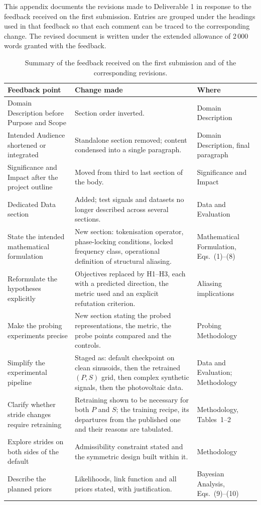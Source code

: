 This appendix documents the revisions made to Deliverable 1 in response to the feedback received on the first submission. Entries are grouped under the headings used in that feedback so that each comment can be traced to the corresponding change. The revised document is written under the extended allowance of 2\,000 words granted with the feedback.

\begin{table}[htbp]
\centering
\small
\begin{tabular}{p{4.0cm} p{7.2cm} p{3.4cm}}
\toprule
\textbf{Feedback point} & \textbf{Change made} & \textbf{Where} \\
\midrule
Domain Description before Purpose and Scope
  & Section order inverted.
  & Domain Description \\
Intended Audience shortened or integrated
  & Standalone section removed; content condensed into a single paragraph.
  & Domain Description, final paragraph \\
Significance and Impact after the project outline
  & Moved from third to last section of the body.
  & Significance and Impact \\
Dedicated Data section
  & Added; test signals and datasets no longer described across several sections.
  & Data and Evaluation \\
State the intended mathematical formulation
  & New section: tokenisation operator, phase-locking conditions, locked
    frequency class, operational definition of structural aliasing.
  & Mathematical Formulation, Eqs.~(1)--(8) \\
Reformulate the hypotheses explicitly
  & Objectives replaced by H1--H3, each with a predicted direction, the metric
    used and an explicit refutation criterion.
  & Aliasing implications \\
Make the probing experiments precise
  & New section stating the probed representations, the metric, the probe
    points compared and the controls.
  & Probing Methodology \\
Simplify the experimental pipeline
  & Staged as: default checkpoint on clean sinusoids, then the retrained
    $(P,S)$ grid, then complex synthetic signals, then the photovoltaic data.
  & Data and Evaluation; Methodology \\
Clarify whether stride changes require retraining
  & Retraining shown to be necessary for both $P$ and $S$; the training recipe,
    its departures from the published one and their reasons are tabulated.
  & Methodology, Tables~1--2 \\
Explore strides on both sides of the default
  & Admissibility constraint stated and the symmetric design built within it.
  & Methodology \\
Describe the planned priors
  & Likelihoods, link function and all priors stated, with justification.
  & Bayesian Analysis, Eqs.~(9)--(10) \\
\bottomrule
\end{tabular}
\caption{Summary of the feedback received on the first submission and of the
corresponding revisions.}
\label{tab:changelog}
\end{table}

